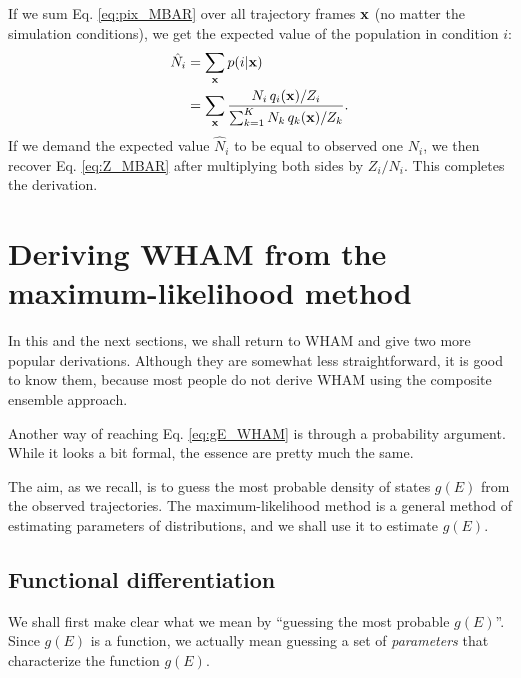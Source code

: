 \documentclass[aip,jcp,preprint,superscriptaddress]{revtex4-1}
\begin{document}
If we sum Eq. \eqref{eq:pix_MBAR}
over all trajectory frames $\mathbf{x}$
(no matter the simulation conditions),
we get the expected value of the population
in condition $i$:
%
\begin{align}
  \hat N_i
  &=
  \sum_{\mathbf{x}} p(i|\mathbf{x})
  \notag \\
  &=
  \sum_{\mathbf{x}}
  \frac{ N_i \, q_i(\mathbf{x}) / Z_i }
  { \sum_{k = 1}^K N_k \, q_k(\mathbf{x}) / Z_k }.
  \label{eq:Ni_WHAM}
\end{align}
%
If we demand the expected value $\hat N_i$
to be equal to observed one $N_i$,
we then recover Eq. \eqref{eq:Z_MBAR}
after multiplying both sides by $Z_i/N_i$.
%
This completes the derivation.






\section{\label{sec:WHAM_maxlikelihood}
Deriving WHAM from the maximum-likelihood method}



In this and the next sections,
we shall return to WHAM
and give two more popular derivations.
%
Although they are somewhat less straightforward,
it is good to know them,
because most people do not derive WHAM
using the composite ensemble approach.



Another way of reaching Eq. \eqref{eq:gE_WHAM}
is through a probability argument\cite{
bartels1997, *gallicchio2005, *habeck2007, *habeck2012, zhu2012}.
%
While it looks a bit formal,
the essence are pretty much the same.



The aim, as we recall, is to guess the most probable
density of states $g(E)$ from the observed trajectories.
%
The maximum-likelihood method is a general method of
estimating parameters of distributions,
and we shall use it to estimate $g(E)$.



\subsection{Functional differentiation}



We shall first make clear
what we mean by ``guessing the most probable $g(E)$''.
%
Since $g(E)$ is a function,
we actually mean guessing a set of \emph{parameters}
that characterize the function $g(E)$.
%
\end{document}
